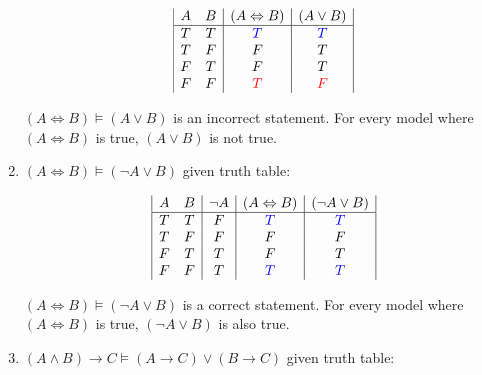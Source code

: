 \documentclass{article}
\begin{document}
\begin{enumerate}
        \begin{center}
        \begin{displaymath}
            \begin{array}{|c c|c|c|}
                A & B & (A \Leftrightarrow B) & (A \lor B) \\
                \hline
                T & T & {\textcolor{blue}{T}} & {\textcolor{blue}{T}}\\
                T & F & F & T\\
                F & T & F & T\\
                F & F & {\textcolor{red}{T}} & {\textcolor{red}{F}}\\
            \end{array}
        \end{displaymath}
        \end{center}
        
    \textit{$(A \Leftrightarrow B) \vDash (A \lor B)$} is an incorrect statement. For every model where $(A \Leftrightarrow B)$ is true, $(A \lor B)$ is not true.
    
    \newpage \item \textit{$(A \Leftrightarrow B) \vDash (\neg A \lor B)$} given truth table: 
    
        \begin{center}
        \begin{displaymath}
            \begin{array}{|c c|c|c|c|}
                A & B & \neg A & (A \Leftrightarrow B) & (\neg A \lor B) \\
                \hline
                T & T & F & {\textcolor{blue}{T}} & {\textcolor{blue}{T}}\\
                T & F & F & F & F\\
                F & T & T & F & T\\
                F & F & T & {\textcolor{blue}{T}} & {\textcolor{blue}{T}}\\
            \end{array}
        \end{displaymath}
        \end{center}
        
    \textit{$(A \Leftrightarrow B) \vDash (\neg A \lor B)$} is a correct statement. For every model where $(A \Leftrightarrow B)$ is true, $(\neg A \lor B)$ is also true.\\
    
    \item \textit{$(A \land B) \rightarrow C \vDash (A \rightarrow C) \lor (B \rightarrow C)$} given truth table: 
    

\end{enumerate}
\end{document}
